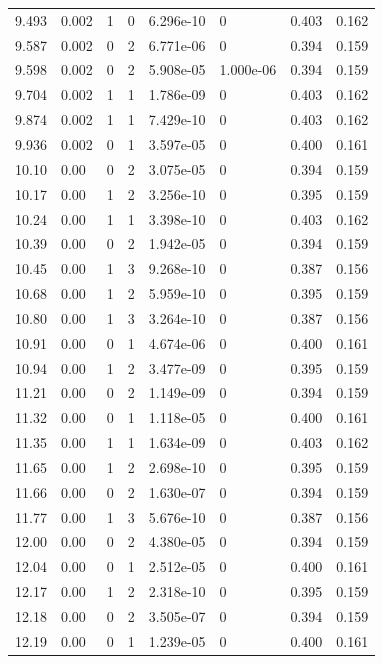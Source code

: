 \documentclass[preview]{standalone}
\begin{document}
{{{\begin{tabular}{L{1.2cm}C{1.2cm} C{0.3cm}C{0.5cm} C{1.4cm}C{1.4cm} C{1.4cm}C{1.4cm}}
  9.493  &  0.002  & 1     &  0 &  6.296e-10  & 0  & 0.403 &  0.162   \\ 
  9.587  &  0.002  & 0     &  2 &  6.771e-06  & 0  & 0.394 &  0.159   \\ 
  9.598  &  0.002  & 0     &  2 &  5.908e-05  & 1.000e-06  & 0.394 &  0.159   \\ 
  9.704  &  0.002  & 1     &  1 &  1.786e-09  & 0  & 0.403 &  0.162   \\ 
  9.874  &  0.002  & 1     &  1 &  7.429e-10  & 0  & 0.403 &  0.162   \\ 
  9.936  &  0.002  & 0     &  1 &  3.597e-05  & 0  & 0.400 &  0.161   \\ 
  10.10  &  0.00  & 0     &  2 &  3.075e-05  & 0  & 0.394 &  0.159   \\ 
  10.17  &  0.00  & 1     &  2 &  3.256e-10  & 0  & 0.395 &  0.159   \\ 
  10.24  &  0.00  & 1     &  1 &  3.398e-10  & 0  & 0.403 &  0.162   \\ 
  10.39  &  0.00  & 0     &  2 &  1.942e-05  & 0  & 0.394 &  0.159   \\ 
  10.45  &  0.00  & 1     &  3 &  9.268e-10  & 0  & 0.387 &  0.156   \\ 
  10.68  &  0.00  & 1     &  2 &  5.959e-10  & 0  & 0.395 &  0.159   \\ 
  10.80  &  0.00  & 1     &  3 &  3.264e-10  & 0  & 0.387 &  0.156   \\ 
  10.91  &  0.00  & 0     &  1 &  4.674e-06  & 0  & 0.400 &  0.161   \\ 
  10.94  &  0.00  & 1     &  2 &  3.477e-09  & 0  & 0.395 &  0.159   \\ 
  11.21  &  0.00  & 0     &  2 &  1.149e-09  & 0  & 0.394 &  0.159   \\ 
  11.32  &  0.00  & 0     &  1 &  1.118e-05  & 0  & 0.400 &  0.161   \\ 
  11.35  &  0.00  & 1     &  1 &  1.634e-09  & 0  & 0.403 &  0.162   \\ 
  11.65  &  0.00  & 1     &  2 &  2.698e-10  & 0  & 0.395 &  0.159   \\ 
  11.66  &  0.00  & 0     &  2 &  1.630e-07  & 0  & 0.394 &  0.159   \\ 
  11.77  &  0.00  & 1     &  3 &  5.676e-10  & 0  & 0.387 &  0.156   \\ 
  12.00  &  0.00  & 0     &  2 &  4.380e-05  & 0  & 0.394 &  0.159   \\ 
  12.04  &  0.00  & 0     &  1 &  2.512e-05  & 0  & 0.400 &  0.161   \\ 
  12.17  &  0.00  & 1     &  2 &  2.318e-10  & 0  & 0.395 &  0.159   \\ 
  12.18  &  0.00  & 0     &  2 &  3.505e-07  & 0  & 0.394 &  0.159   \\ 
  12.19  &  0.00  & 0     &  1 &  1.239e-05  & 0  & 0.400 &  0.161   \\ 
\hline 
\end{tabular} 

}}}
\end{document}
